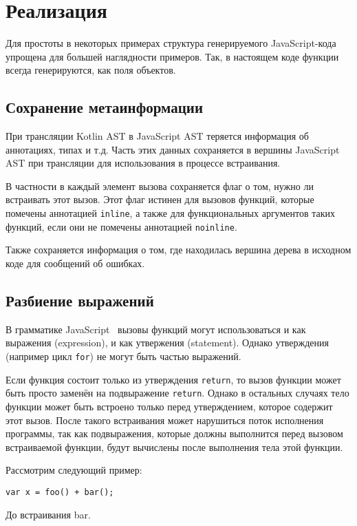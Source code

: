 \section{Реализация}

Для простоты в некоторых примерах
структура генерируемого JavaScript-кода
упрощена для большей наглядности примеров.
Так, в настоящем коде функции всегда генерируются,
как поля объектов.

\subsection{Сохранение метаинформации}

При трансляции Kotlin AST в JavaScript AST теряется информация
об аннотациях, типах и т.д. Часть этих данных сохраняется
в вершины JavaScript AST при трансляции для использования
в процессе встраивания.

В частности в каждый элемент вызова сохраняется
флаг о том, нужно ли встраивать этот вызов.
Этот флаг истинен для вызовов функций, которые
помечены аннотацией \texttt{inline}, а также
для функциональных аргументов таких функций,
если они не помечены аннотацией \texttt{noinline}.

Также сохраняется информация о том, где
находилась вершина дерева в исходном коде для сообщений об ошибках.

\subsection{Разбиение выражений}

В грамматике JavaScript~\cite{EcmaScript} вызовы функций
могут использоваться и как выражения (expression), и
как утвержения (statement). Однако утверждения
(например цикл \texttt{for}) не могут быть частью выражений.

Если функция состоит только из утверждения \texttt{return},
то вызов функции может быть просто заменён на подвыражение
\texttt{return}. Однако в остальных случаях
тело функции может быть встроено только перед
утверждением, которое содержит этот вызов. После такого
встраивания может нарушиться поток исполнения программы,
так как подвыражения, которые должны выполнится
перед вызовом встраиваемой функции, будут вычислены после
выполнения тела этой функции.

Рассмотрим следующий пример:
\begin{listing}[H]
\begin{verbatim}
var x = foo() + bar();
\end{verbatim}
\caption{До встраивания bar.}
\end{listing}

